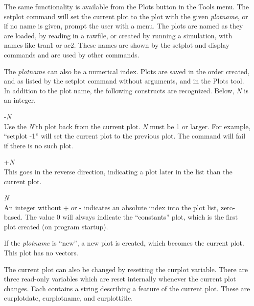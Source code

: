 The same functionality is available from the {\cb Plots} button in the
{\cb Tools} menu.  The {\cb setplot} command will set the current plot
to the plot with the given {\it plotname\/}, or if no name is given,
prompt the user with a menu.  The plots are named as they are loaded,
by reading in a rawfile, or created by running a simulation, with
names like {\vt tran1} or {\vt ac2}.  These names are shown by the
{\cb setplot} and {\cb display} commands and are used by other
commands.

The {\it plotname} can also be a numerical index.  Plots are saved in
the order created, and as listed by the {\cb setplot} command without
arguments, and in the {\cb Plots} tool.  In addition to the plot name,
the following constructs are recognized.  Below, {\it N} is an
integer.

\begin{description}
\item{\vt -}{\it N}\\
Use the {\it N\/}'th plot back from the current plot.  {\it N} must be
1 or larger.  For example, ``{\vt setplot -1}'' will set the current
plot to the previous plot.  The command will fail if there is no such
plot.

\item{\vt +}{\it N}\\
This goes in the reverse direction, indicating a plot later in the 
list than the current plot.

\item{\it N}\\
An integer without {\vt +} or {\vt -} indicates an absolute index into
the plot list, zero-based.  The value 0 will always indicate the
``constants'' plot, which is the first plot created (on program
startup).
\end{description}

If the {\it plotname} is ``{\vt new}'', a new plot is created, which
becomes the current plot.  This plot has no vectors.

The current plot can also be changed by resetting the {\et curplot}
variable.  There are three read-only variables which are reset
internally whenever the current plot changes.  Each contains a string
describing a feature of the current plot.  These are {\et
curplotdate}, {\et curplotname}, and {\et curplottitle}.

\subsection{}


